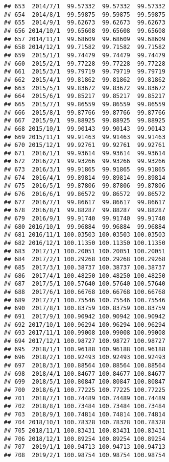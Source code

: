 \documentclass[
]{article}
\begin{document}
\begin{verbatim}
## 653  2014/7/1  99.57332  99.57332  99.57332
## 654  2014/8/1  99.59875  99.59875  99.59875
## 655  2014/9/1  99.62673  99.62673  99.62673
## 656 2014/10/1  99.65608  99.65608  99.65608
## 657 2014/11/1  99.68609  99.68609  99.68609
## 658 2014/12/1  99.71582  99.71582  99.71582
## 659  2015/1/1  99.74479  99.74479  99.74479
## 660  2015/2/1  99.77228  99.77228  99.77228
## 661  2015/3/1  99.79719  99.79719  99.79719
## 662  2015/4/1  99.81862  99.81862  99.81862
## 663  2015/5/1  99.83672  99.83672  99.83672
## 664  2015/6/1  99.85217  99.85217  99.85217
## 665  2015/7/1  99.86559  99.86559  99.86559
## 666  2015/8/1  99.87766  99.87766  99.87766
## 667  2015/9/1  99.88925  99.88925  99.88925
## 668 2015/10/1  99.90143  99.90143  99.90143
## 669 2015/11/1  99.91463  99.91463  99.91463
## 670 2015/12/1  99.92761  99.92761  99.92761
## 671  2016/1/1  99.93614  99.93614  99.93614
## 672  2016/2/1  99.93266  99.93266  99.93266
## 673  2016/3/1  99.91865  99.91865  99.91865
## 674  2016/4/1  99.89814  99.89814  99.89814
## 675  2016/5/1  99.87806  99.87806  99.87806
## 676  2016/6/1  99.86572  99.86572  99.86572
## 677  2016/7/1  99.86617  99.86617  99.86617
## 678  2016/8/1  99.88287  99.88287  99.88287
## 679  2016/9/1  99.91740  99.91740  99.91740
## 680 2016/10/1  99.96884  99.96884  99.96884
## 681 2016/11/1 100.03503 100.03503 100.03503
## 682 2016/12/1 100.11350 100.11350 100.11350
## 683  2017/1/1 100.20051 100.20051 100.20051
## 684  2017/2/1 100.29268 100.29268 100.29268
## 685  2017/3/1 100.38737 100.38737 100.38737
## 686  2017/4/1 100.48250 100.48250 100.48250
## 687  2017/5/1 100.57640 100.57640 100.57640
## 688  2017/6/1 100.66768 100.66768 100.66768
## 689  2017/7/1 100.75546 100.75546 100.75546
## 690  2017/8/1 100.83759 100.83759 100.83759
## 691  2017/9/1 100.90942 100.90942 100.90942
## 692 2017/10/1 100.96294 100.96294 100.96294
## 693 2017/11/1 100.99008 100.99008 100.99008
## 694 2017/12/1 100.98727 100.98727 100.98727
## 695  2018/1/1 100.96188 100.96188 100.96188
## 696  2018/2/1 100.92493 100.92493 100.92493
## 697  2018/3/1 100.88564 100.88564 100.88564
## 698  2018/4/1 100.84677 100.84677 100.84677
## 699  2018/5/1 100.80847 100.80847 100.80847
## 700  2018/6/1 100.77225 100.77225 100.77225
## 701  2018/7/1 100.74489 100.74489 100.74489
## 702  2018/8/1 100.73484 100.73484 100.73484
## 703  2018/9/1 100.74814 100.74814 100.74814
## 704 2018/10/1 100.78328 100.78328 100.78328
## 705 2018/11/1 100.83431 100.83431 100.83431
## 706 2018/12/1 100.89254 100.89254 100.89254
## 707  2019/1/1 100.94713 100.94713 100.94713
## 708  2019/2/1 100.98754 100.98754 100.98754

\end{verbatim}
\end{document}
